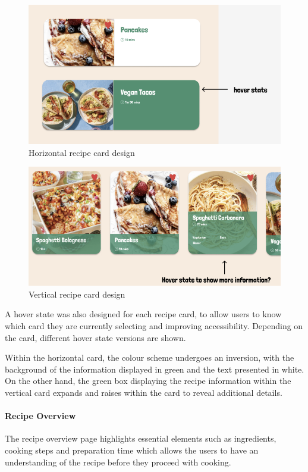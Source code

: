 \documentclass{article}
\begin{document}
\begin{figure}[h]
  \includegraphics[width=1.0\textwidth]{assets/design-images/Version 1 Horizontal Cards.png}
  \centering
  \caption{Horizontal recipe card design}
\end{figure}

\begin{figure}[h]
  \includegraphics[width=1.0\textwidth]{assets/design-images/Version 1 Vertical Cards.png}
  \centering
  \caption{Vertical recipe card design}
\end{figure}

A hover state was also designed for each recipe card, to allow users to know which card they are currently selecting and improving accessibility. Depending on the card, different hover state versions are shown. 

Within the horizontal card, the colour scheme undergoes an inversion, with the background of the information displayed in green and the text presented in white. On the other hand, the green box displaying the recipe information within the vertical card expands and raises within the card to reveal additional details.
    
\paragraph{Recipe Overview}
The recipe overview page highlights essential elements such as ingredients, cooking steps and preparation time which allows the users to have an understanding of the recipe before they proceed with cooking.
\end{document}
